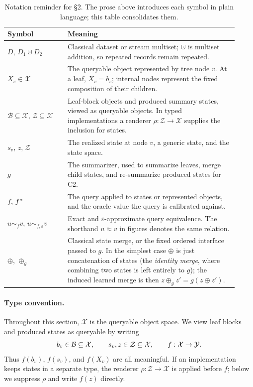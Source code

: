 \begin{table}[t]
\centering
\small
\begin{tabular}{@{}p{0.24\linewidth}p{0.68\linewidth}@{}}
\toprule
Symbol & Meaning \\
\midrule
\(D\), \(D_1\uplus D_2\) &
Classical dataset or stream multiset; \(\uplus\) is multiset addition,
so repeated records remain repeated. \\
\(X_v\in\mathcal X\) &
The queryable object represented by tree node \(v\). At a leaf,
\(X_v=b_v\); internal nodes represent the fixed composition of their
children. \\
\(\mathcal B\subseteq\mathcal X\), \(\mathcal Z\subseteq\mathcal X\) &
Leaf-block objects and produced summary states, viewed as queryable
objects. In typed implementations a renderer
\(\rho:\mathcal Z\to\mathcal X\) supplies the inclusion for states. \\
\(s_v\), \(z\), \(\mathcal Z\) &
The realized state at node \(v\), a generic state, and the state space. \\
\(g\) &
The summarizer, used to summarize leaves, merge child states, and
re-summarize produced states for C2. \\
\(f\), \(f^\ast\) &
The query applied to states or represented objects, and the oracle
value the query is calibrated against. \\
\(u\sim_f v\), \(u\sim_{f,\varepsilon}v\) &
Exact and \(\varepsilon\)-approximate query equivalence. The shorthand
\(u\approx v\) in figures denotes the same relation. \\
\(\oplus\), \(\oplus_g\) &
Classical state merge, or the fixed ordered interface passed to \(g\).
In the simplest case \(\oplus\) is just concatenation of states (the
\emph{identity merge}, where combining two states is left entirely to
\(g\)); the induced learned merge is then
\(z\oplus_g z'=g(z\oplus z')\). \\
\bottomrule
\end{tabular}
\caption{Notation reminder for \S2. The prose above introduces each
symbol in plain language; this table consolidates them.}
\label{tab:v7-section2-notation}
\end{table}

\paragraph{Type convention.}
Throughout this section, \(\mathcal X\) is the queryable object space.
We view leaf blocks and produced states as queryable by writing
\[
  b_v\in\mathcal B\subseteq\mathcal X,\qquad
  s_v,z\in\mathcal Z\subseteq\mathcal X,\qquad
  f:\mathcal X\to\mathcal{Y} .
\]
Thus \(f(b_v)\), \(f(s_v)\), and \(f(X_v)\) are all meaningful. If an
implementation keeps states in a separate type, the renderer
\(\rho:\mathcal Z\to\mathcal X\) is applied before \(f\); below we
suppress \(\rho\) and write \(f(z)\) directly.

